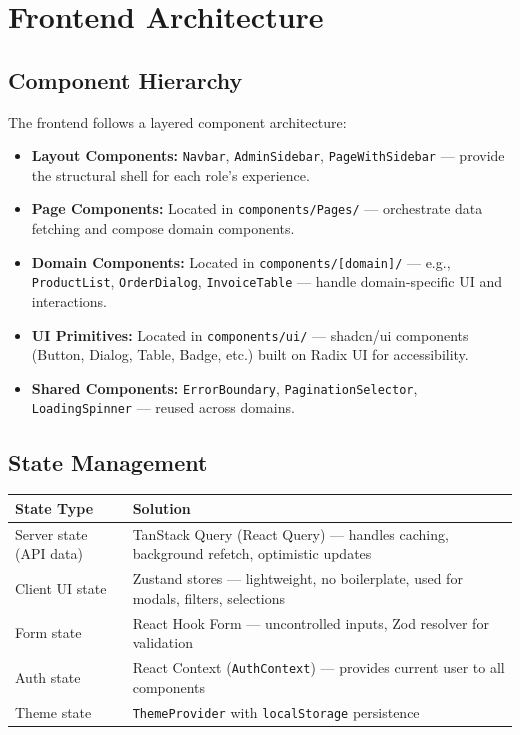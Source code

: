﻿\documentclass[12pt,a4paper]{report}
\begin{document}
\section{Frontend Architecture}

\subsection{Component Hierarchy}

The frontend follows a layered component architecture:

\begin{itemize}[leftmargin=1.5em]
  \item \textbf{Layout Components:} \texttt{Navbar}, \texttt{AdminSidebar}, \texttt{PageWithSidebar} --- provide the structural shell for each role's experience.
  \item \textbf{Page Components:} Located in \texttt{components/Pages/} --- orchestrate data fetching and compose domain components.
  \item \textbf{Domain Components:} Located in \texttt{components/[domain]/} --- e.g., \texttt{ProductList}, \texttt{OrderDialog}, \texttt{InvoiceTable} --- handle domain-specific UI and interactions.
  \item \textbf{UI Primitives:} Located in \texttt{components/ui/} --- shadcn/ui components (Button, Dialog, Table, Badge, etc.) built on Radix UI for accessibility.
  \item \textbf{Shared Components:} \texttt{ErrorBoundary}, \texttt{PaginationSelector}, \texttt{LoadingSpinner} --- reused across domains.
\end{itemize}

\subsection{State Management}

\begin{center}
\begin{tabularx}{\textwidth}{lX}
  \toprule
  \textbf{State Type} & \textbf{Solution} \\
  \midrule
  Server state (API data) & TanStack Query (React Query) --- handles caching, background refetch, optimistic updates \\
  Client UI state         & Zustand stores --- lightweight, no boilerplate, used for modals, filters, selections \\
  Form state              & React Hook Form --- uncontrolled inputs, Zod resolver for validation \\
  Auth state              & React Context (\texttt{AuthContext}) --- provides current user to all components \\
  Theme state             & \texttt{ThemeProvider} with \texttt{localStorage} persistence \\
  \bottomrule
\end{tabularx}
\end{center}
\end{document}
